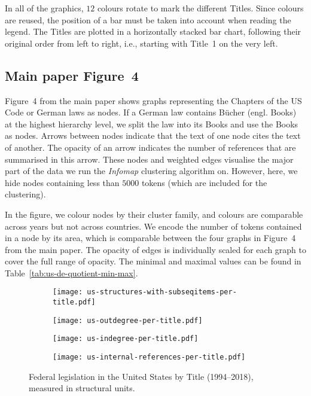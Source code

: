 In all of the graphics, $12$ colours rotate to mark the different Titles.
Since colours are reused, the position of a bar must be taken into account when reading the legend.
The Titles are plotted in a horizontally stacked bar chart, 
following their original order from left to right, i.e., starting with Title~1 on the very left.

\subsection{Main paper Figure~4} %

Figure~4 from the main paper %
shows graphs representing the Chapters of the US Code or German laws as nodes.
If a German law contains Bücher (engl. Books) at the highest hierarchy level, 
we split the law into its Books and use the Books as nodes.
Arrows between nodes indicate that the text of one node cites the text of another.
The opacity of an arrow indicates the number of references that are summarised in this arrow.
These nodes and weighted edges visualise the major part of the data we run the \emph{Infomap} clustering algorithm on.
However, here, we hide nodes containing less than $5000$ tokens (which are included for the clustering).

In the figure, 
we colour nodes by their cluster family, and colours are comparable across years but not across countries. 
We encode the number of tokens contained in a node by its area,
which is comparable between the four graphs in Figure~4 from the main paper. %
The opacity of edges is individually scaled for each graph to cover the full range of opacity. 
The minimal and maximal values can be found in Table~\ref{tab:us-de-quotient-min-max}.

\newpage

\begin{figure}[H]
	\vspace*{-16pt}\centering
	\begin{subfigure}{0.9\linewidth}
		\texttt{[image: us-structures-with-subseqitems-per-title.pdf]}
	\end{subfigure}
	\begin{subfigure}{0.9\linewidth}
		\texttt{[image: us-outdegree-per-title.pdf]}
	\end{subfigure}
	\begin{subfigure}{0.9\linewidth}
		\texttt{[image: us-indegree-per-title.pdf]}
	\end{subfigure}
	\begin{subfigure}{0.9\linewidth}
		\texttt{[image: us-internal-references-per-title.pdf]}
	\end{subfigure}
	\caption{Federal legislation in the United States by Title (1994--2018), measured in structural units.}
	\label{fig:us-other-per-title} 
\end{figure}

